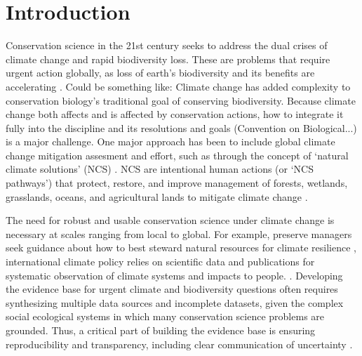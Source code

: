 \documentclass{article}
\begin{document}
\newpage
\section* {Introduction}

\par Conservation science in the 21st century seeks to address the dual crises of  climate change and rapid biodiversity loss. These are problems that require urgent action globally, as loss of earth's biodiversity and its benefits are accelerating \citep{brondizio2019assessing, ripple2017extinction,tittensor2014mid}. Could be something like: Climate change has added complexity to conservation biology's traditional goal of conserving biodiversity. Because climate change both affects and is affected by conservation actions, how to integrate it fully into the discipline and its resolutions and goals (Convention on Biological...) is a major challenge. One major approach has been to include global climate change mitigation assesment and effort, such as through the concept of `natural climate solutions' (NCS) \citep{ellis2024principles}. NCS are intentional human actions (or `NCS pathways') that protect, restore, and improve management of forests, wetlands, grasslands, oceans, and agricultural lands to mitigate climate change \citep{griscom2017natural}.

\par The need for robust and usable conservation science under climate change is necessary at scales ranging from local to global. For example, preserve managers seek guidance about how to best steward natural resources for climate resilience \citep{Nadeau2015}, international climate policy relies on scientific data and publications for systematic observation of climate systems and impacts to people. \cite{ipcc2007}. Developing the evidence base for urgent climate and biodiversity questions often requires synthesizing multiple data sources and incomplete datasets, given the complex social ecological systems in which many conservation science problems are grounded. Thus, a critical part of building the evidence base is ensuring reproducibility and transparency, including clear communication of uncertainty \citep{ellis2024principles,ipcc2007}. %
\end{document}
